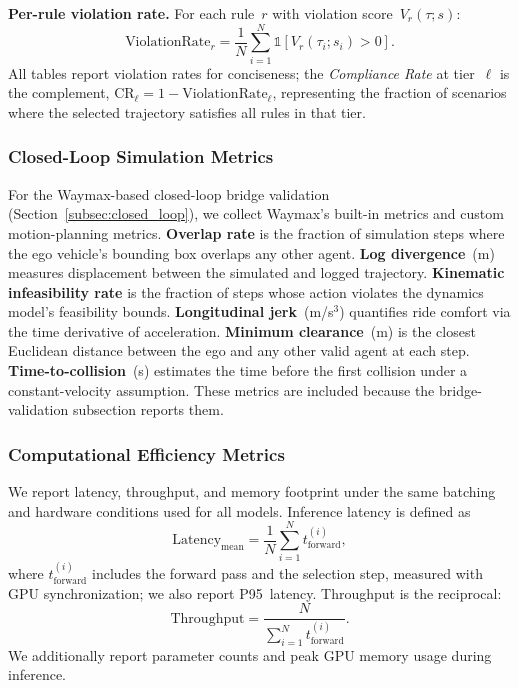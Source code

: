 \textbf{Per-rule violation rate.}
For each rule~$r$ with violation score~$V_r(\tau; s)$:
\begin{equation}
\text{ViolationRate}_r
= \frac{1}{N} \sum_{i=1}^{N} \mathbb{1}\!\left[V_r(\tau_i; s_i) > 0\right].
\end{equation}
\noindent All tables report violation rates for conciseness; the \emph{Compliance Rate} at tier~$\ell$ is the complement, $\text{CR}_\ell = 1 - \text{ViolationRate}_\ell$, representing the fraction of scenarios where the selected trajectory satisfies all rules in that tier.

\subsubsection{Closed-Loop Simulation Metrics}
\label{subsubsec:closed_loop_metrics}

For the Waymax-based closed-loop bridge validation (Section~\ref{subsec:closed_loop}), we collect Waymax's built-in metrics and custom motion-planning metrics. \textbf{Overlap rate} is the fraction of simulation steps where the ego vehicle's bounding box overlaps any other agent. \textbf{Log divergence}~(m) measures displacement between the simulated and logged trajectory. \textbf{Kinematic infeasibility rate} is the fraction of steps whose action violates the dynamics model's feasibility bounds. \textbf{Longitudinal jerk}~(m/s$^3$) quantifies ride comfort via the time derivative of acceleration. \textbf{Minimum clearance}~(m) is the closest Euclidean distance between the ego and any other valid agent at each step. \textbf{Time-to-collision}~(s) estimates the time before the first collision under a constant-velocity assumption. These metrics are included because the bridge-validation subsection reports them.

\subsubsection{Computational Efficiency Metrics}

We report latency, throughput, and memory footprint under the same batching and hardware conditions used for all models.  Inference latency is defined as
\begin{equation}
\text{Latency}_{\text{mean}} = \frac{1}{N} \sum_{i=1}^{N} t_{\text{forward}}^{(i)},
\end{equation}
where $t_{\text{forward}}^{(i)}$ includes the forward pass and the selection step, measured with GPU synchronization; we also report P95~latency. Throughput is the reciprocal:
\begin{equation}
\text{Throughput} = \frac{N}{\sum_{i=1}^{N} t_{\text{forward}}^{(i)}}.
\end{equation}
We additionally report parameter counts and peak GPU memory usage during inference.

